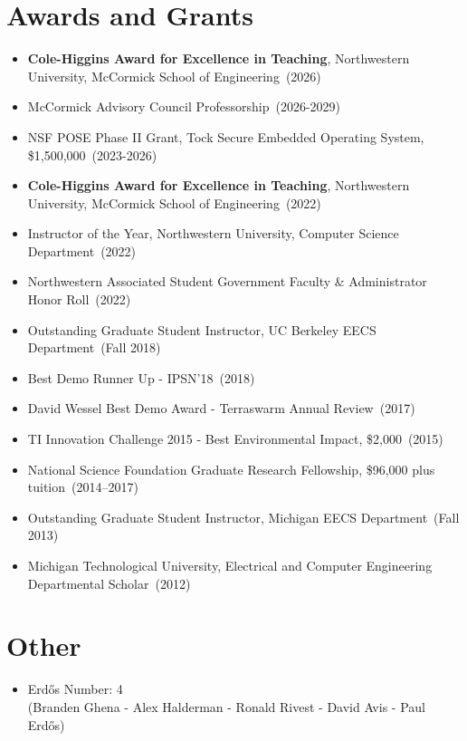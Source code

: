\documentclass{article}
\begin{document}
\section*{Awards and Grants}
\vspace{-6pt}
\begin{itemize}
  \item[] \textbf{Cole-Higgins Award for Excellence in Teaching}, Northwestern University, McCormick School of Engineering~(2026)
  \item[] McCormick Advisory Council Professorship~(2026-2029)
  \item[] NSF POSE Phase II Grant, Tock Secure Embedded Operating System, \$1,500,000~(2023-2026)
  \item[] \textbf{Cole-Higgins Award for Excellence in Teaching}, Northwestern University, McCormick School of Engineering~(2022)
  \item[] Instructor of the Year, Northwestern University, Computer Science Department~(2022)
  \item[] Northwestern Associated Student Government Faculty \& Administrator Honor Roll~(2022)
  \item[] Outstanding Graduate Student Instructor, UC Berkeley EECS Department~(Fall 2018)
  \item[] Best Demo Runner Up - IPSN'18~(2018)
  \item[] David Wessel Best Demo Award - Terraswarm Annual Review~(2017)
  \item[] TI Innovation Challenge 2015 - Best Environmental Impact, \$2,000~(2015)
  \item[] National Science Foundation Graduate Research Fellowship, \$96,000 plus tuition~(2014--2017)
  \item[] Outstanding Graduate Student Instructor, Michigan EECS Department~(Fall 2013)
  \item[] Michigan Technological University, Electrical and Computer Engineering Departmental Scholar~(2012)
\end{itemize}

\section*{Other}
\vspace{-6pt}
\begin{itemize}
  \item[] Erdős Number: 4\\(Branden Ghena - Alex Halderman - Ronald Rivest - David Avis - Paul Erdős)
\end{itemize}
\end{document}
